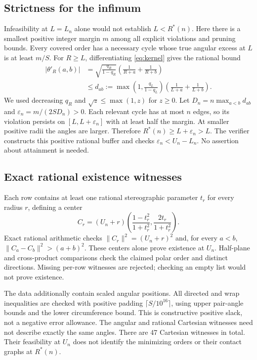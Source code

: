\documentclass[11pt]{article}
\theoremstyle{definition}
\theoremstyle{remark}
\newcommand{\Rstar}{R^*}
\begin{document}
\subsection{Strictness for the infimum}\label{sec:strict}
Infeasibility at $L=L_n$ alone would not establish $L<\Rstar(n)$.
Here there is a smallest positive integer margin $m$ among all explicit
violations and pruning bounds. Every covered order has a necessary cycle
whose true angular excess at $L$ is at least $m/S$.
For $R\ge L$, differentiating \eqref{eq:kernel} gives the rational bound
\begin{align*}
 |\theta'_R(a,b)|
 &=\sqrt{\frac{q_R}{1-q_R}}
          \left(\frac1{R+a}+\frac1{R+b}\right)\\
 &\le d_{ab}:=\max\!\left(1,\frac{q_L}{1-q_L}\right)
          \left(\frac1{L+a}+\frac1{L+b}\right).
\end{align*}
We used decreasing $q_R$ and $\sqrt z\le\max(1,z)$ for $z\ge0$.
Let $D_n=n\max_{a<b}d_{ab}$ and
$\varepsilon_n=m/(2SD_n)>0$. Each relevant cycle has at most $n$
edges, so its violation persists on $[L,L+\varepsilon_n]$ with at
least half the margin. At smaller positive radii the angles are larger.
Therefore $\Rstar(n)\ge L+\varepsilon_n>L$. The verifier constructs
this positive rational buffer and checks $\varepsilon_n<U_n-L_n$.
No assertion about attainment is needed.

\subsection{Exact rational existence witnesses}
Each row contains at least one rational stereographic parameter $t_r$ for
every radius $r$, defining a center
\begin{equation}\label{eq:stereo}
 C_r=(U_n+r)\left(\frac{1-t_r^2}{1+t_r^2},
                         \frac{2t_r}{1+t_r^2}\right).
\end{equation}
Exact rational arithmetic checks $\|C_r\|^2=(U_n+r)^2$ and, for
every $a<b$, $\|C_a-C_b\|^2>(a+b)^2$. These centers alone prove
existence at $U_n$. Half-plane and cross-product comparisons check the
claimed polar order and distinct directions. Missing per-row witnesses
are rejected; checking an empty list would not prove existence.

The data additionally contain scaled angular positions. All directed and
wrap inequalities are checked with positive padding $\lceil S/10^{16}\rceil$,
using upper pair-angle bounds and the lower circumference bound. This is
constructive positive slack, not a negative error allowance. The angular
and rational Cartesian witnesses need not describe exactly the same angles.
There are 47 Cartesian witnesses in total. Their feasibility at $U_n$
does not identify the minimizing orders or their contact graphs at $\Rstar(n)$.
\end{document}
